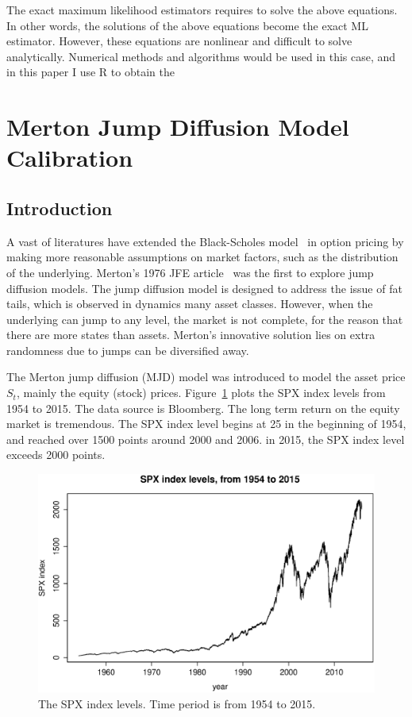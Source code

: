 \documentclass[11pt,reqno,final]{amsart}
\begin{document}
The exact maximum likelihood estimators requires to solve the above equations. In other words, the solutions of the above equations become the exact ML estimator. However, these equations are nonlinear and difficult to solve analytically. Numerical methods and algorithms would be used in this case, and in this paper I use $\mathrm{R}$ to obtain the


\section{Merton Jump Diffusion Model Calibration}
\subsection{Introduction}
A vast of literatures have extended the Black-Scholes model~\cite{BS73} in option pricing by making more reasonable assumptions on market factors, such as the distribution of the underlying. Merton's 1976 JFE article~\cite{M76} was the first to explore jump diffusion models. The jump diffusion model is designed to address the issue of fat tails, which is observed in dynamics many asset classes. However, when the underlying can jump to any level, the market is not complete, for the reason that there are more states than assets. Merton's innovative solution lies on extra randomness due to jumps can be diversified away.

The Merton jump diffusion (MJD) model was introduced to model the asset price $S_t$, mainly the equity (stock) prices. Figure~\ref{plot_spx} plots the SPX index levels from 1954 to 2015. The data source is Bloomberg. The long term return on the equity market is tremendous. The SPX index level begins at 25 in the beginning of 1954, and reached over 1500 points around 2000 and 2006. in 2015, the SPX index level exceeds 2000 points.

\begin{figure}
  \centering
  \includegraphics[scale=0.6]{plot_spx.eps}
  \caption{The SPX index levels. Time period is from 1954 to 2015.}\label{plot_spx}
\end{figure}
\end{document}
